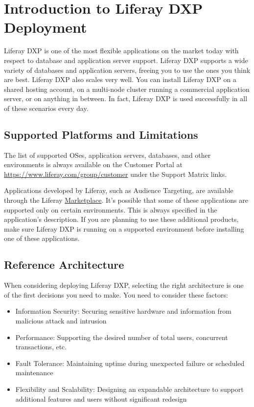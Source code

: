 \chapter{Introduction to Liferay DXP
Deployment}\label{introduction-to-liferay-dxp-deployment}

Liferay DXP is one of the most flexible applications on the market today
with respect to database and application server support. Liferay DXP
supports a wide variety of databases and application servers, freeing
you to use the ones you think are best. Liferay DXP also scales very
well. You can install Liferay DXP on a shared hosting account, on a
multi-node cluster running a commercial application server, or on
anything in between. In fact, Liferay DXP is used successfully in all of
these scenarios every day.

\section{Supported Platforms and
Limitations}\label{supported-platforms-and-limitations}

The list of supported OSes, application servers, databases, and other
environments is always available on the Customer Portal at
\url{https://www.liferay.com/group/customer} under the Support Matrix
links.

Applications developed by Liferay, such as Audience Targeting, are
available through the Liferay
\href{https://www.liferay.com/marketplace/}{Marketplace}. It's possible
that some of these applications are supported only on certain
environments. This is always specified in the application's description.
If you are planning to use these additional products, make sure Liferay
DXP is running on a supported environment before installing one of these
applications.

\section{Reference Architecture}\label{reference-architecture}

When considering deploying Liferay DXP, selecting the right architecture
is one of the first decisions you need to make. You need to consider
these factors:

\begin{itemize}
\tightlist
\item
  Information Security: Securing sensitive hardware and information from
  malicious attack and intrusion
\item
  Performance: Supporting the desired number of total users, concurrent
  transactions, etc.
\item
  Fault Tolerance: Maintaining uptime during unexpected failure or
  scheduled maintenance
\item
  Flexibility and Scalability: Designing an expandable architecture to
  support additional features and users without significant redesign
\end{itemize}


